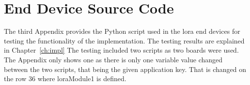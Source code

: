 
\chapter{End Device Source Code}\label{appx:testing}

The third Appendix provides the Python script used in the \gls{lora} end devices for testing the functionality of the implementation.
The testing results are explained in Chapter~\ref{ch:impl}
The testing included two scripts as two boards were used.
The Appendix only shows one as there is only one variable value changed between the two scripts, that being the given application key.
That is changed on the row 36 where loraModule1 is defined.


